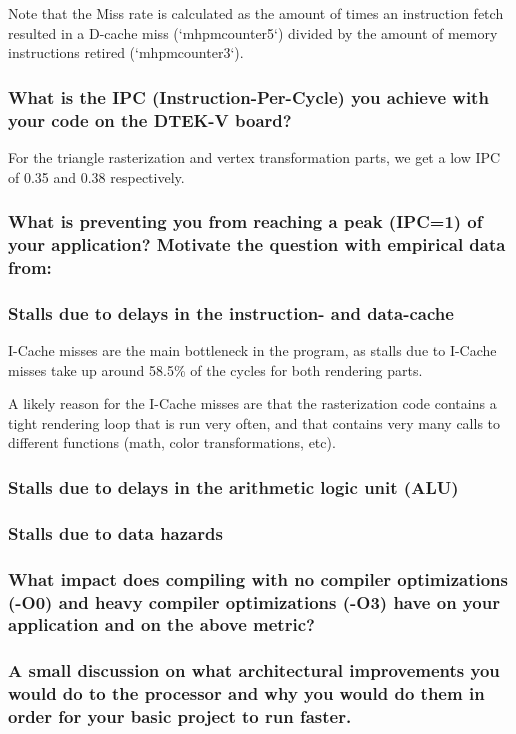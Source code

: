 \documentclass{article}
\begin{document}
Note that the Miss rate is calculated as the amount of times an instruction fetch resulted in a D-cache miss (`mhpmcounter5`) divided by the amount of memory instructions retired (`mhpmcounter3`).

\subsubsection*{What is the IPC (Instruction-Per-Cycle) you achieve with your code on the DTEK-V board?}

For the triangle rasterization and vertex transformation parts, we get a low IPC of 0.35 and 0.38 respectively.

\subsubsection*{What is preventing you from reaching a peak (IPC=1) of your application? Motivate the question with empirical data from:}
\subsubsection*{Stalls due to delays in the instruction- and data-cache}

I-Cache misses are the main bottleneck in the program, as stalls due to I-Cache misses take up around 58.5\% of the cycles for both rendering parts. 

A likely reason for the I-Cache misses are that the rasterization code contains a tight rendering loop that is run very often, and that contains very many calls to different functions (math, color transformations, etc). 

\subsubsection*{Stalls due to delays in the arithmetic logic unit (ALU)}
\subsubsection*{Stalls due to data hazards}
\subsubsection*{What impact does compiling with no compiler optimizations (-O0) and heavy compiler optimizations (-O3) have on your application and on the above metric?}
\subsubsection*{A small discussion on what architectural improvements you would do to the processor and why you would do them in order for your basic project to run faster.}



\end{document}
